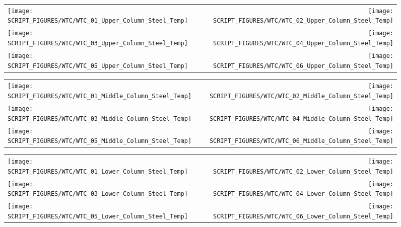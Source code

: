\newpage

\begin{figure}[p]
\begin{tabular*}{\textwidth}{l@{\extracolsep{\fill}}r}
\texttt{[image: SCRIPT\_FIGURES/WTC/WTC\_01\_Upper\_Column\_Steel\_Temp]} &
\texttt{[image: SCRIPT\_FIGURES/WTC/WTC\_02\_Upper\_Column\_Steel\_Temp]} \\
\texttt{[image: SCRIPT\_FIGURES/WTC/WTC\_03\_Upper\_Column\_Steel\_Temp]} &
\texttt{[image: SCRIPT\_FIGURES/WTC/WTC\_04\_Upper\_Column\_Steel\_Temp]} \\
\texttt{[image: SCRIPT\_FIGURES/WTC/WTC\_05\_Upper\_Column\_Steel\_Temp]} &
\texttt{[image: SCRIPT\_FIGURES/WTC/WTC\_06\_Upper\_Column\_Steel\_Temp]}
\end{tabular*}
\label{NIST_WTC_Upper_Column_Steel}
\end{figure}

\begin{figure}[p]
\begin{tabular*}{\textwidth}{l@{\extracolsep{\fill}}r}
\texttt{[image: SCRIPT\_FIGURES/WTC/WTC\_01\_Middle\_Column\_Steel\_Temp]} &
\texttt{[image: SCRIPT\_FIGURES/WTC/WTC\_02\_Middle\_Column\_Steel\_Temp]} \\
\texttt{[image: SCRIPT\_FIGURES/WTC/WTC\_03\_Middle\_Column\_Steel\_Temp]} &
\texttt{[image: SCRIPT\_FIGURES/WTC/WTC\_04\_Middle\_Column\_Steel\_Temp]} \\
\texttt{[image: SCRIPT\_FIGURES/WTC/WTC\_05\_Middle\_Column\_Steel\_Temp]} &
\texttt{[image: SCRIPT\_FIGURES/WTC/WTC\_06\_Middle\_Column\_Steel\_Temp]}
\end{tabular*}
\label{NIST_WTC_Middle_Column_Steel}
\end{figure}

\begin{figure}[p]
\begin{tabular*}{\textwidth}{l@{\extracolsep{\fill}}r}
\texttt{[image: SCRIPT\_FIGURES/WTC/WTC\_01\_Lower\_Column\_Steel\_Temp]} &
\texttt{[image: SCRIPT\_FIGURES/WTC/WTC\_02\_Lower\_Column\_Steel\_Temp]} \\
\texttt{[image: SCRIPT\_FIGURES/WTC/WTC\_03\_Lower\_Column\_Steel\_Temp]} &
\texttt{[image: SCRIPT\_FIGURES/WTC/WTC\_04\_Lower\_Column\_Steel\_Temp]} \\
\texttt{[image: SCRIPT\_FIGURES/WTC/WTC\_05\_Lower\_Column\_Steel\_Temp]} &
\texttt{[image: SCRIPT\_FIGURES/WTC/WTC\_06\_Lower\_Column\_Steel\_Temp]}
\end{tabular*}
\label{NIST_WTC_Lower_Column_Steel}
\end{figure}

